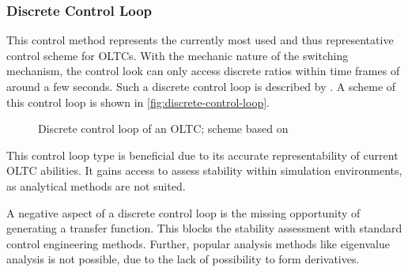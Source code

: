 
\subsubsection{Discrete Control Loop}

This control method represents the currently most used and thus representative control scheme for \acsp{OLTC}. With the mechanic nature of the switching mechanism, the control look can only access discrete ratios within time frames of around a few seconds. Such a discrete control loop is described by \textcite{milanoHybridControlModel2011,milanoPowerSystemModelling2010}. A scheme of this control loop is shown in \autoref{fig:discrete-control-loop}.

\begin{figure}[htb!]
        \centering
        \caption{Discrete control loop of an \acs{OLTC}; scheme based on \textcite{milanoHybridControlModel2011}}
        \label{fig:discrete-control-loop}
\end{figure}

This control loop type is beneficial due to its accurate representability of current \acs{OLTC} abilities. It gains access to assess stability within simulation environments, as analytical methods are not suited.

A negative aspect of a discrete control loop is the missing opportunity of generating a transfer function. This blocks the stability assessment with standard control engineering methods. Further, popular analysis methods like eigenvalue analysis is not possible, due to the lack of possibility to form derivatives.

% 

